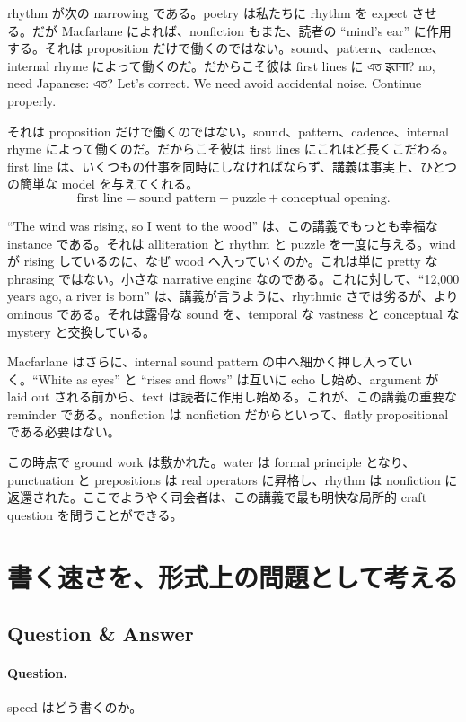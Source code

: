 rhythm が次の narrowing である。poetry は私たちに rhythm を expect させる。だが Macfarlane によれば、nonfiction もまた、読者の ``mind's ear'' に作用する。それは proposition だけで働くのではない。sound、pattern、cadence、internal rhyme によって働くのだ。だからこそ彼は first lines に এত इतना? no, need Japanese: এত? Let's correct. We need avoid accidental noise. Continue properly.

それは proposition だけで働くのではない。sound、pattern、cadence、internal rhyme によって働くのだ。だからこそ彼は first lines にこれほど長くこだわる。first line は、いくつもの仕事を同時にしなければならず、講義は事実上、ひとつの簡単な model を与えてくれる。
\begin{equation}
\text{first line} = \text{sound pattern} + \text{puzzle} + \text{conceptual opening}.
\end{equation}

``The wind was rising, so I went to the wood'' は、この講義でもっとも幸福な instance である。それは alliteration と rhythm と puzzle を一度に与える。wind が rising しているのに、なぜ wood へ入っていくのか。これは単に pretty な phrasing ではない。小さな narrative engine なのである。これに対して、``12{,}000 years ago, a river is born'' は、講義が言うように、rhythmic さでは劣るが、より ominous である。それは露骨な sound を、temporal な vastness と conceptual な mystery と交換している。

Macfarlane はさらに、internal sound pattern の中へ細かく押し入っていく。``White as eyes'' と ``rises and flows'' は互いに echo し始め、argument が laid out される前から、text は読者に作用し始める。これが、この講義の重要な reminder である。nonfiction は nonfiction だからといって、flatly propositional である必要はない。

この時点で ground work は敷かれた。water は formal principle となり、punctuation と prepositions は real operators に昇格し、rhythm は nonfiction に返還された。ここでようやく司会者は、この講義で最も明快な局所的 craft question を問うことができる。

\section{書く速さを、形式上の問題として考える}

\subsection{Question \& Answer}

\paragraph{Question.} speed はどう書くのか。


